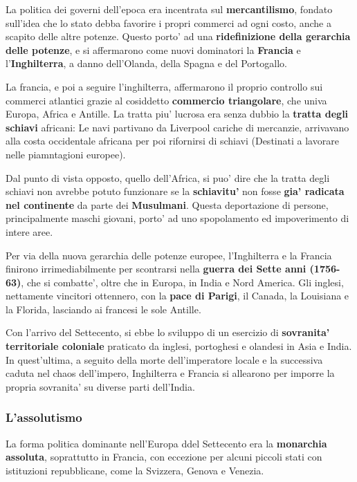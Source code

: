 \documentclass{article}
\begin{document}
{{    La politica dei governi dell'epoca era incentrata sul \textbf{mercantilismo}, fondato sull'idea che lo stato debba favorire i propri commerci ad ogni costo, anche a scapito delle altre potenze. Questo porto' ad una \textbf{ridefinizione della gerarchia delle potenze}, e si affermarono come nuovi dominatori la \textbf{Francia} e l'\textbf{Inghilterra}, a danno dell'Olanda, della Spagna e del Portogallo.

    La francia, e poi a seguire l'inghilterra, affermarono il proprio controllo sui commerci atlantici grazie al cosiddetto \textbf{commercio triangolare}, che univa Europa, Africa e Antille. La tratta piu' lucrosa era senza dubbio la \textbf{tratta degli schiavi} africani: Le navi partivano da Liverpool cariche di mercanzie, arrivavano alla costa occidentale africana per poi rifornirsi di schiavi \small{(Destinati a lavorare nelle piamntagioni europee)}.

    Dal punto di vista opposto, quello dell'Africa, si puo' dire che la tratta degli schiavi non avrebbe potuto funzionare se la \textbf{schiavitu'} non fosse \textbf{gia' radicata nel continente} da parte dei \textbf{Musulmani}. Questa deportazione di persone, principalmente maschi giovani, porto' ad uno spopolamento ed impoverimento di intere aree.

    Per via della nuova gerarchia delle potenze europee, l'Inghilterra e la Francia finirono irrimediabilmente per scontrarsi nella \textbf{guerra dei Sette anni (1756-63)}, che si combatte', oltre che in Europa, in India e Nord America. Gli inglesi, nettamente vincitori ottennero, con la \textbf{pace di Parigi}, il Canada, la Louisiana e la Florida, lasciando ai francesi le sole Antille.

    Con l'arrivo del Settecento, si ebbe lo sviluppo di un esercizio di \textbf{sovranita' territoriale coloniale} praticato da inglesi, portoghesi e olandesi in Asia e India. In quest'ultima, a seguito della morte dell'imperatore locale e la successiva caduta nel chaos dell'impero, Inghilterra e Francia si allearono per imporre la propria sovranita' su diverse parti dell'India.

    \subsubsection{L'assolutismo}
    La forma politica dominante nell'Europa ddel Settecento era la \textbf{monarchia assoluta}, soprattutto in Francia, con eccezione per alcuni piccoli stati con istituzioni repubblicane, come la Svizzera, Genova e Venezia.

}}
\end{document}
